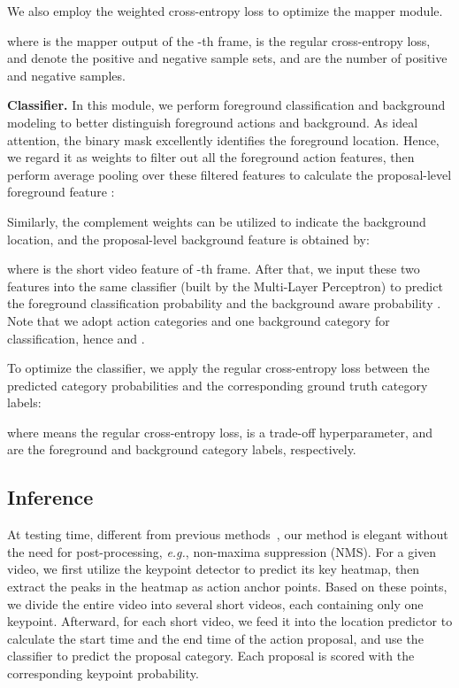 \documentclass[final]{cvpr}
\begin{document}
We also employ the weighted cross-entropy loss to optimize the mapper module.

where  is the mapper output of the -th frame,  is the regular cross-entropy loss,  and  denote the positive and negative sample sets,  and  are the number of positive and negative samples.






\textbf{Classifier.}
In this module, we perform foreground classification and background modeling to better distinguish foreground actions and background.
As ideal attention, the binary mask  excellently identifies the foreground location. Hence, we regard it as weights to filter out all the foreground action features, then perform average pooling over these filtered features to calculate the proposal-level foreground feature :




Similarly, the complement weights  can be utilized to indicate the background location, and the proposal-level background feature  is obtained by:

where  is the short video feature of -th frame.
After that, we input these two features into the same classifier (built by the Multi-Layer Perceptron) to predict the foreground classification probability  and the background aware probability . Note that we adopt  action categories and one background category for classification, hence  and .



To optimize the classifier, we apply the regular cross-entropy loss between the predicted category probabilities and the corresponding ground truth category labels:

where  means the regular cross-entropy loss,  is a trade-off hyperparameter,  and  are the foreground and background category labels, respectively.







\subsection{Inference}
At testing time, different from previous methods~\cite{ma2020sf,lee2019background,shi2020weakly,nguyen2019weakly}, our method is elegant without the need for post-processing, \emph{e.g.}, non-maxima suppression (NMS).
For a given video, we first utilize the keypoint detector to predict its key heatmap, then extract the peaks in the heatmap as action anchor points. Based on these points, we divide the entire video into several short videos, each containing only one keypoint.
Afterward, for each short video, we feed it into the location predictor to calculate the start time and the end time of the action proposal, and use the classifier to predict the proposal category. Each proposal is scored with the corresponding keypoint probability.
\end{document}
